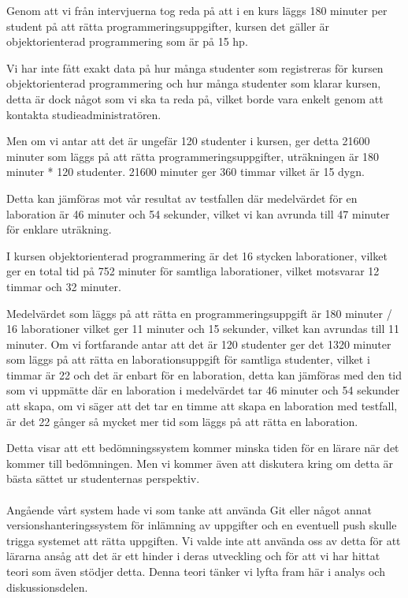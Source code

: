 \documentclass[a4paper,11pt]{article}
\begin{document}
{Genom att vi från intervjuerna tog reda på att i en kurs läggs 180 minuter per student på att rätta programmeringsuppgifter, kursen det gäller är objektorienterad programmering som är på 15 hp. 

Vi har inte fått exakt data på hur många studenter som registreras för kursen objektorienterad programmering och hur många studenter som klarar kursen, detta är dock något som vi ska ta reda på, vilket borde vara enkelt genom att kontakta studieadministratören.

Men om vi antar att det är ungefär 120 studenter i kursen, ger detta 21600 minuter som läggs på att rätta programmeringsuppgifter, uträkningen är 180 minuter * 120 studenter. 21600 minuter ger 360 timmar vilket är 15 dygn.

Detta kan jämföras mot vår resultat av testfallen där medelvärdet för en laboration är 46 minuter och 54 sekunder, vilket vi kan avrunda till 47 minuter för enklare uträkning.

I kursen objektorienterad programmering är det 16 stycken laborationer, vilket ger en total tid på 752 minuter för samtliga laborationer, vilket motsvarar 12 timmar och 32 minuter.

Medelvärdet som läggs på att rätta en programmeringsuppgift är 180 minuter / 16 laborationer vilket ger 11 minuter och 15 sekunder, vilket kan avrundas till 11 minuter. Om vi fortfarande antar att det är 120 studenter ger det 1320 minuter som läggs på att rätta en laborationsuppgift för samtliga studenter, vilket i timmar är 22 och det är enbart för en laboration, detta kan jämföras med den tid som vi uppmätte där en laboration i medelvärdet tar 46 minuter och 54 sekunder att skapa, om vi säger att det tar en timme att skapa en laboration med testfall, är det 22 gånger så mycket mer tid som läggs på att rätta en laboration.

Detta visar att ett bedömningssystem kommer minska tiden för en lärare när det kommer till bedömningen. Men vi kommer även att diskutera kring om detta är bästa sättet ur studenternas perspektiv.
\\
\\
Angående vårt system hade vi som tanke att använda Git eller något annat versionshanteringssystem för inlämning av uppgifter och en eventuell push skulle trigga systemet att rätta uppgiften. Vi valde inte att använda oss av detta för att lärarna ansåg att det är ett hinder i deras utveckling och för att vi har hittat teori som även stödjer detta. Denna teori tänker vi lyfta fram här i analys och diskussionsdelen.

}
\end{document}
